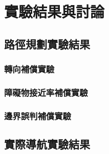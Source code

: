 \chapter{實驗結果與討論}

\section{路徑規劃實驗結果}
\subsection{轉向補償實驗}
\subsection{障礙物接近率補償實驗}
\subsection{邊界誤判補償實驗}
\section{實際導航實驗結果}
